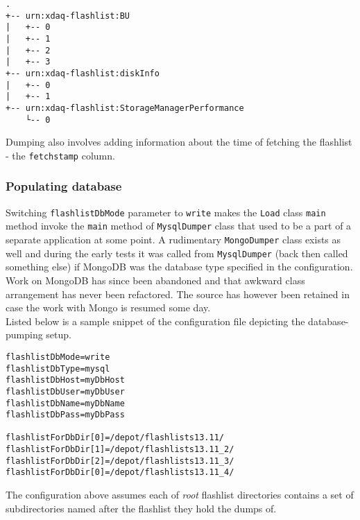 \begin{lstlisting}
.
+-- urn:xdaq-flashlist:BU
|   +-- 0
|   +-- 1
|   +-- 2
|   +-- 3
+-- urn:xdaq-flashlist:diskInfo
|   +-- 0
|   +-- 1
+-- urn:xdaq-flashlist:StorageManagerPerformance
    └-- 0

\end{lstlisting}
Dumping also involves adding information about the time of fetching the flashlist - the \texttt{fetchstamp} column.

\subsubsection{Populating database}
Switching \texttt{flashlistDbMode} parameter to \texttt{write} makes the \texttt{Load} class \texttt{main} method invoke the \texttt{main} method of \texttt{MysqlDumper} class that used to be a part of a separate application at some point. A rudimentary \texttt{MongoDumper} class exists as well and during the early tests it was called from \texttt{MysqlDumper} (back then called something else) if MongoDB was the database type specified in the configuration. Work on MongoDB has since been abandoned and that awkward class arrangement has never been refactored. The source has however been retained in case the work with Mongo is resumed some day. \\
Listed below is a sample snippet of the configuration file depicting the database-pumping setup. 

\begin{lstlisting}
flashlistDbMode=write
flashlistDbType=mysql
flashlistDbHost=myDbHost
flashlistDbUser=myDbUser
flashlistDbName=myDbName
flashlistDbPass=myDbPass

flashlistForDbDir[0]=/depot/flashlists13.11/
flashlistForDbDir[1]=/depot/flashlists13.11_2/
flashlistForDbDir[2]=/depot/flashlists13.11_3/
flashlistForDbDir[0]=/depot/flashlists13.11_4/
\end{lstlisting}

The configuration above assumes each of \emph{root} flashlist directories contains a set of subdirectories named after the flashlist they hold the dumps of.
